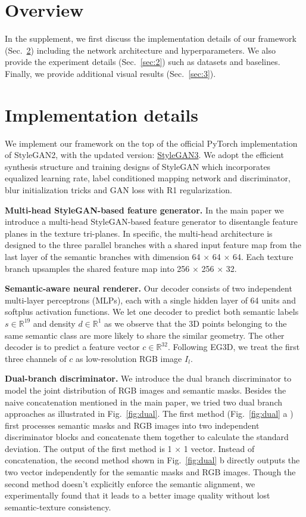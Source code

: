 \documentclass[acmtog]{acmart}
\begin{document}
\appendix

\section{Overview}
In the supplement, we first discuss the implementation details of our framework (Sec.~\ref{sec:1}) including the network architecture and hyperparameters. We also provide the experiment details (Sec.~\ref{sec:2}) such as datasets and baselines. Finally, we provide additional visual results (Sec.~\ref{sec:3}). 
\section{Implementation details}
\label{sec:1}
We implement our framework on the top of the official PyTorch implementation of StyleGAN2, with the updated version: \href{https://github.com/NVlabs/stylegan3}{StyleGAN3}. We adopt the efficient synthesis structure and training designs of StyleGAN which incorporates equalized learning rate, label conditioned mapping network and discriminator, blur initialization tricks and GAN loss with R1 regularization. 

\noindent \textbf{Multi-head StyleGAN-based feature generator.} In the main paper we introduce a multi-head StyleGAN-based feature generator to disentangle feature planes in the texture tri-planes. In specific, the multi-head architecture is designed to the three parallel branches with a shared input feature map from the last layer of the semantic branches with dimension 64 $\times$ 64 $\times$ 64. Each texture branch upsamples the shared feature map into 256 $\times$ 256 $\times$ 32. 

\noindent \textbf{Semantic-aware neural renderer.} Our decoder consists of two independent multi-layer perceptrons (MLPs), each with a single hidden layer of 64 units and softplus activation functions. We let one decoder to predict both semantic labels $s \in \mathbb{R}^{19}$ and density $d \in \mathbb{R}^{1}$ as we observe that the 3D points belonging to the same semantic class are more likely to share the similar geometry. The other decoder is to predict a feature vector $c \in \mathbb{R}^{32}$. Following EG3D\cite{eg3d}, we treat the first three channels of $c$ as low-resolution RGB image $I_{l}$. 

\noindent \textbf{Dual-branch discriminator.} 
We introduce the dual branch discriminator to model the joint distribution of RGB images and semantic masks. Besides the naive concatenation mentioned in the main paper, we tried two dual branch approaches as illustrated in Fig.~\ref{fig:dual}. The first method (Fig.~\ref{fig:dual} a ) first processes semantic masks and RGB images into two independent discriminator blocks and concatenate them together to calculate the standard deviation. The output of the first method is 1 $\times$ 1 vector. Instead of concatenation, the second method shown in Fig.~\ref{fig:dual} b directly outputs the two vector independently for the semantic masks and RGB images. Though the second method doesn't explicitly enforce the semantic alignment, we experimentally found that it leads to a better image quality without lost semantic-texture consistency. 
\end{document}
